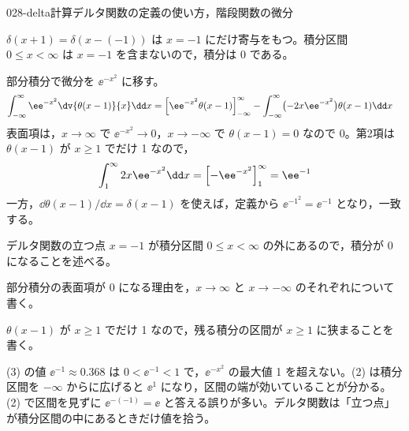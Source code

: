 \documentclass[uplatex,dvipdfmx,a4paper,11pt]{jsarticle}
\begin{document}
\begin{mondai}{028-delta}{計算}{デルタ関数の定義の使い方，階段関数の微分}
\begin{tadashii}
 $\delta(x+1)=\delta(x-(-1))$ は $x=-1$ にだけ寄与をもつ。積分区間 $0\le x<\infty$ は $x=-1$ を含まないので，積分は 0 である。

 部分積分で微分を $\ee^{-x^{2}}$ に移す。
\begin{align*}
\int_{-\infty}^{\infty}\ee^{-x^{2}}\dv{\theta(x-1)}{x}\dd x&=\Bigl[\ee^{-x^{2}}\theta(x-1)\Bigr]_{-\infty}^{\infty}-\int_{-\infty}^{\infty}\bigl(-2x\ee^{-x^{2}}\bigr)\theta(x-1)\dd x
\end{align*}
表面項は，$x\to\infty$ で $\ee^{-x^{2}}\to 0$，$x\to-\infty$ で $\theta(x-1)=0$ なので 0。第2項は $\theta(x-1)$ が $x\ge 1$ でだけ 1 なので，
\[ \int_{1}^{\infty}2x\ee^{-x^{2}}\dd x=\Bigl[-\ee^{-x^{2}}\Bigr]_{1}^{\infty}=\ee^{-1} \]
一方，$\dd \theta(x-1)/\dd x=\delta(x-1)$ を使えば，定義から $\ee^{-1^{2}}=\ee^{-1}$ となり，一致する。
\begin{ronten}
  \item {} デルタ関数の立つ点 $x=-1$ が積分区間 $0\le x<\infty$ の外にあるので，積分が 0 になることを述べる。
  \item {} 部分積分の表面項が 0 になる理由を，$x\to\infty$ と $x\to-\infty$ のそれぞれについて書く。
  \item {} $\theta(x-1)$ が $x\ge1$ でだけ 1 なので，残る積分の区間が $x\ge1$ に狭まることを書く。
\end{ronten}
\kenzan (3) の値 $\ee^{-1}\approx 0.368$ は $0<\ee^{-1}<1$ で，$\ee^{-x^{2}}$ の最大値 1 を超えない。(2) は積分区間を $-\infty$ からに広げると $\ee^{1}$ になり，区間の端が効いていることが分かる。
\tsumazuki (2) で区間を見ずに $\ee^{-(-1)}=\ee$ と答える誤りが多い。デルタ関数は「立つ点」が積分区間の中にあるときだけ値を拾う。
\end{tadashii}
\end{mondai}
\end{document}

